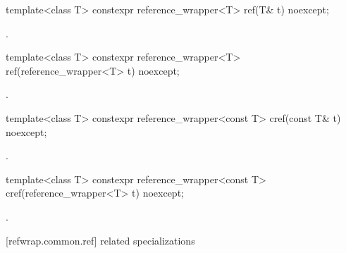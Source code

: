 %
\begin{itemdecl}
template<class T> constexpr reference_wrapper<T> ref(T& t) noexcept;
\end{itemdecl}

\begin{itemdescr}
\pnum
\returns
{}.
\end{itemdescr}

%
\begin{itemdecl}
template<class T> constexpr reference_wrapper<T> ref(reference_wrapper<T> t) noexcept;
\end{itemdecl}

\begin{itemdescr}
\pnum
\returns
{}.
\end{itemdescr}

%
\begin{itemdecl}
template<class T> constexpr reference_wrapper<const T> cref(const T& t) noexcept;
\end{itemdecl}

\begin{itemdescr}
\pnum
\returns
{}.
\end{itemdescr}

%
\begin{itemdecl}
template<class T> constexpr reference_wrapper<const T> cref(reference_wrapper<T> t) noexcept;
\end{itemdecl}

\begin{itemdescr}
\pnum
\returns
{}.
\end{itemdescr}

[refwrap.common.ref]{ related specializations}

